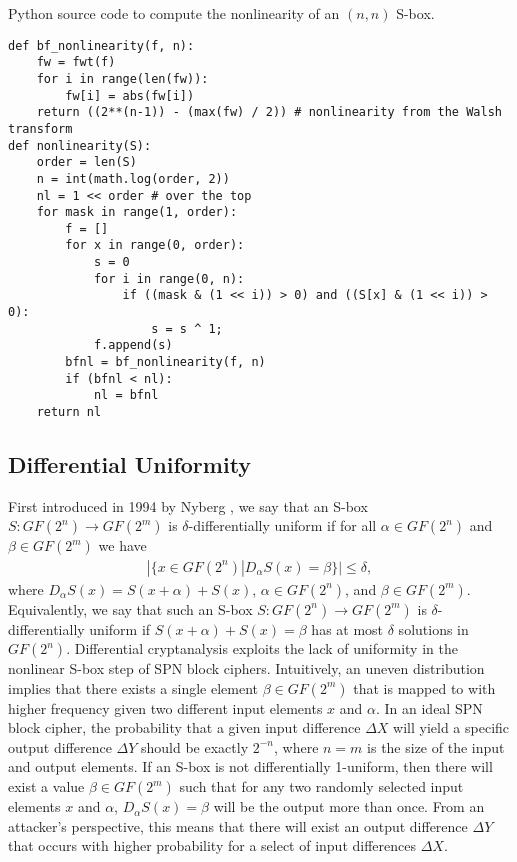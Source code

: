 \begin{listing}[ht!]
\caption{Python source code to compute the nonlinearity of an $(n, n)$ S-box.}
\begin{verbatim}
def bf_nonlinearity(f, n):
	fw = fwt(f)
	for i in range(len(fw)):
		fw[i] = abs(fw[i])
	return ((2**(n-1)) - (max(fw) / 2)) # nonlinearity from the Walsh transform
def nonlinearity(S):
	order = len(S)
	n = int(math.log(order, 2))
	nl = 1 << order # over the top
	for mask in range(1, order): 
		f = []
		for x in range(0, order): 
			s = 0
			for i in range(0, n):
				if ((mask & (1 << i)) > 0) and ((S[x] & (1 << i)) > 0):
					s = s ^ 1;
			f.append(s)
		bfnl = bf_nonlinearity(f, n)
		if (bfnl < nl):
			nl = bfnl 
	return nl
\end{verbatim}
\label{lst:nonlinearityCode}
\end{listing}


\subsection{Differential Uniformity}
First introduced in 1994 by Nyberg \cite{Nyberg94-1}, we say that an S-box $S : GF(2^n) \to GF(2^m)$ is $\delta$-differentially uniform if for all $\alpha \in GF(2^n)$ and $\beta \in GF(2^m)$ we have
\begin{align*}
|\{x \in GF(2^n) | D_{\alpha}S(x) = \beta\}| \leq \delta, 
\end{align*}
where $D_{\alpha}S(x) = S(x + \alpha) + S(x)$, $\alpha \in GF(2^n)$, and $\beta \in GF(2^m)$. Equivalently, we say that such an S-box $S : GF(2^n) \to GF(2^m)$ is $\delta$-differentially uniform if $S(x + \alpha) + S(x) = \beta$ has at most $\delta$ solutions in $GF(2^n)$. Differential cryptanalysis exploits the lack of uniformity in the nonlinear S-box step of SPN block ciphers. Intuitively, an uneven distribution implies that there exists a single element $\beta \in GF(2^m)$ that is mapped to with higher frequency given two different input elements $x$ and $\alpha$. In an ideal SPN block cipher, the probability that a given input difference $\Delta X$ will yield a specific output difference $\Delta Y$ should be exactly $2^{-n}$, where $n = m$ is the size of the input and output elements. If an S-box is not differentially 1-uniform, then there will exist a value $\beta \in GF(2^m)$ such that for any two randomly selected input elements $x$ and $\alpha$, $ D_{\alpha}S(x) = \beta$ will be the output more than once. From an attacker's perspective, this means that there will exist an output difference $\Delta Y$ that occurs with higher probability for a select of input differences $\Delta X$.

